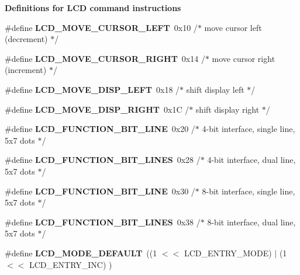 \begin{Indent}{\bf Definitions for L\+CD command instructions}
\begin{DoxyCompactItemize}
\item 
\#define {\bfseries L\+C\+D\+\_\+\+M\+O\+V\+E\+\_\+\+C\+U\+R\+S\+O\+R\+\_\+\+L\+E\+FT}~0x10 /$\ast$ move cursor left  (decrement)          $\ast$/
\item 
\#define {\bfseries L\+C\+D\+\_\+\+M\+O\+V\+E\+\_\+\+C\+U\+R\+S\+O\+R\+\_\+\+R\+I\+G\+HT}~0x14 /$\ast$ move cursor right (increment)          $\ast$/
\item 
\#define {\bfseries L\+C\+D\+\_\+\+M\+O\+V\+E\+\_\+\+D\+I\+S\+P\+\_\+\+L\+E\+FT}~0x18 /$\ast$ shift display left                     $\ast$/
\item 
\#define {\bfseries L\+C\+D\+\_\+\+M\+O\+V\+E\+\_\+\+D\+I\+S\+P\+\_\+\+R\+I\+G\+HT}~0x1\+C /$\ast$ shift display right                    $\ast$/
\item 
\#define {\bfseries L\+C\+D\+\_\+\+F\+U\+N\+C\+T\+I\+O\+N\+\_\+B\+I\+T\+\_\+L\+I\+NE}~0x20 /$\ast$ 4-\/bit interface, single line, 5x7 dots $\ast$/
\item 
\#define {\bfseries L\+C\+D\+\_\+\+F\+U\+N\+C\+T\+I\+O\+N\+\_\+B\+I\+T\+\_\+L\+I\+N\+ES}~0x28 /$\ast$ 4-\/bit interface, dual line,   5x7 dots $\ast$/
\item 
\#define {\bfseries L\+C\+D\+\_\+\+F\+U\+N\+C\+T\+I\+O\+N\+\_\+B\+I\+T\+\_\+L\+I\+NE}~0x30 /$\ast$ 8-\/bit interface, single line, 5x7 dots $\ast$/
\item 
\#define {\bfseries L\+C\+D\+\_\+\+F\+U\+N\+C\+T\+I\+O\+N\+\_\+B\+I\+T\+\_\+L\+I\+N\+ES}~0x38 /$\ast$ 8-\/bit interface, dual line,   5x7 dots $\ast$/
\item 
\#define {\bfseries L\+C\+D\+\_\+\+M\+O\+D\+E\+\_\+\+D\+E\+F\+A\+U\+LT}~((1 $<$$<$ L\+C\+D\+\_\+\+E\+N\+T\+R\+Y\+\_\+\+M\+O\+DE) $\vert$ (1 $<$$<$ L\+C\+D\+\_\+\+E\+N\+T\+R\+Y\+\_\+\+I\+NC) )
\end{DoxyCompactItemize}
\end{Indent}
